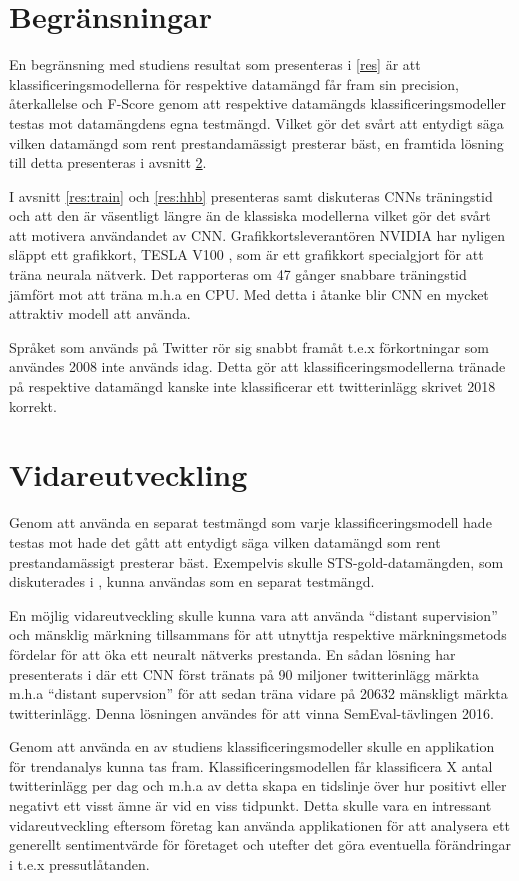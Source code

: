 \documentclass{kaumasters} %
\begin{document}
\section{Begränsningar}
En begränsning med studiens resultat som presenteras i \ref{res} är att klassificeringsmodellerna för respektive datamängd får fram sin precision, återkallelse och F-Score genom att respektive datamängds klassificeringsmodeller testas mot datamängdens egna testmängd. Vilket gör det svårt att entydigt säga vilken datamängd som rent prestandamässigt presterar bäst, en framtida lösning till detta presenteras i avsnitt \ref{slut:fw}.

I avsnitt \ref{res:train} och \ref{res:hhb} presenteras samt diskuteras CNNs träningstid och att den är väsentligt längre än de klassiska modellerna vilket gör det svårt att motivera användandet av CNN. Grafikkortsleverantören NVIDIA har nyligen släppt ett grafikkort, TESLA V100 \cite{slut:002}, som är ett grafikkort specialgjort för att träna neurala nätverk. Det rapporteras om 47 gånger snabbare träningstid jämfört mot att träna m.h.a en CPU. Med detta i åtanke blir CNN en mycket attraktiv modell att använda. 

Språket som används på Twitter rör sig snabbt framåt t.e.x förkortningar som användes 2008 inte används idag. Detta gör att klassificeringsmodellerna tränade på respektive datamängd kanske inte klassificerar ett twitterinlägg skrivet 2018 korrekt. 
\section{Vidareutveckling} \label{slut:fw}
Genom att använda en separat testmängd som varje klassificeringsmodell hade testas mot hade det gått att entydigt säga vilken datamängd som rent prestandamässigt presterar bäst. Exempelvis skulle STS-gold-datamängden, som diskuterades i \cite{slut:testmangd}, kunna användas som en separat testmängd.

En möjlig vidareutveckling skulle kunna vara att använda “distant supervision” och mänsklig märkning tillsammans för att utnyttja respektive märkningsmetods fördelar för att öka ett neuralt nätverks prestanda. En sådan lösning har presenterats i \cite{slut:004} där ett CNN först tränats på 90 miljoner twitterinlägg märkta m.h.a “distant supervsion” för att sedan träna vidare på 20632 mänskligt märkta twitterinlägg. Denna lösningen användes för att vinna SemEval-tävlingen 2016. 

Genom att använda en av studiens klassificeringsmodeller skulle en applikation för trendanalys kunna tas fram. Klassificeringsmodellen får klassificera X antal twitterinlägg per dag och m.h.a av detta skapa en tidslinje över hur positivt eller negativt ett visst ämne är vid en viss tidpunkt. Detta skulle vara en intressant vidareutveckling eftersom företag kan använda applikationen för att analysera ett generellt sentimentvärde för företaget och utefter det göra eventuella förändringar i t.e.x pressutlåtanden.
\end{document}
